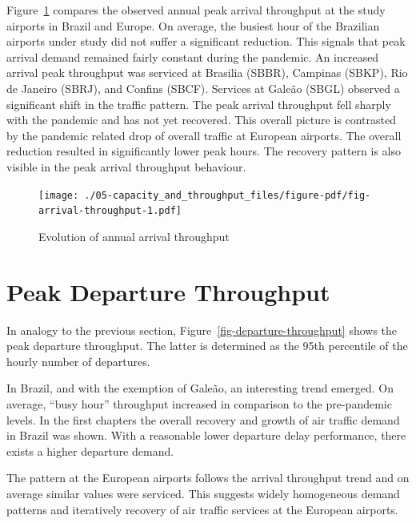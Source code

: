\documentclass[
  a4paper,
  DIV=11,
  numbers=noendperiod]{scrreport}
\begin{document}
Figure~\ref{fig-arrival-throughput} compares the observed annual peak
arrival throughput at the study airports in Brazil and Europe. On
average, the busiest hour of the Brazilian airports under study did not
suffer a significant reduction. This signals that peak arrival demand
remained fairly constant during the pandemic. An increased arrival peak
throughput was serviced at Brasilia (SBBR), Campinas (SBKP), Rio de
Janeiro (SBRJ), and Confins (SBCF). Services at Galeão (SBGL) observed a
significant shift in the traffic pattern. The peak arrival throughput
fell sharply with the pandemic and has not yet recovered. This overall
picture is contrasted by the pandemic related drop of overall traffic at
European airports. The overall reduction resulted in significantly lower
peak hours. The recovery pattern is also visible in the peak arrival
throughput behaviour.

\begin{figure}[H]

{\centering \texttt{[image: ./05-capacity\_and\_throughput\_files/figure-pdf/fig-arrival-throughput-1.pdf]}

}

\caption{\label{fig-arrival-throughput}Evolution of annual arrival
throughput}

\end{figure}

\hypertarget{peak-departure-throughput}{%
\section{Peak Departure Throughput}\label{peak-departure-throughput}}

In analogy to the previous section,
Figure~\ref{fig-departure-throughput} shows the peak departure
throughput. The latter is determined as the 95th percentile of the
hourly number of departures.

In Brazil, and with the exemption of Galeão, an interesting trend
emerged. On average, ``busy hour'' throughput increased in comparison to
the pre-pandemic levels. In the first chapters the overall recovery and
growth of air traffic demand in Brazil was shown. With a reasonable
lower departure delay performance, there exists a higher departure
demand.

The pattern at the European airports follows the arrival throughput
trend and on average similar values were serviced. This suggests widely
homogeneous demand patterns and iteratively recovery of air traffic
services at the European airports.
\end{document}
